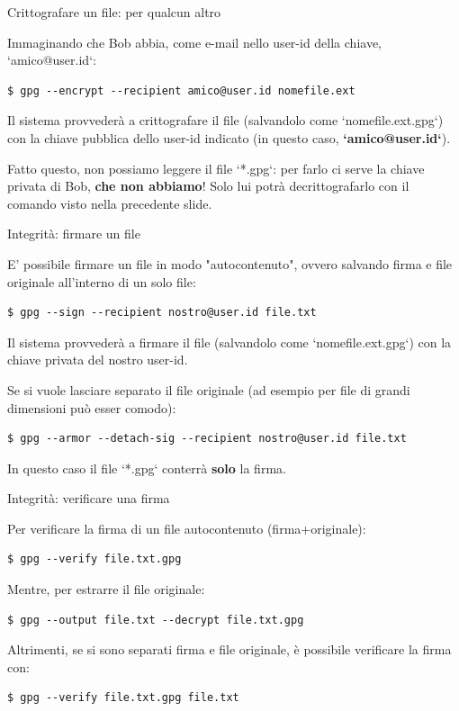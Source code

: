 \documentclass[10pt]{beamer}
\begin{document}
\begin{frame}[fragile]{Crittografare un file: per qualcun altro}

Immaginando che Bob abbia, come e-mail nello user-id della chiave, `amico@user.id`:

\begin{verbatim}
$ gpg --encrypt --recipient amico@user.id nomefile.ext
\end{verbatim}

Il sistema provvederà a crittografare il file (salvandolo come `nomefile.ext.gpg`) con la chiave pubblica dello user-id indicato (in questo caso, \textbf{`amico@user.id`}).

Fatto questo, non possiamo leggere il file `*.gpg`: per farlo ci serve la chiave privata di Bob, \textbf{che non abbiamo}! Solo lui potrà decrittografarlo con il comando visto nella precedente slide.

\end{frame}

\begin{frame}[fragile]{Integrità: firmare un file}

E' possibile firmare un file in modo "autocontenuto", ovvero salvando firma e file originale all'interno di un solo file:

\begin{verbatim}
$ gpg --sign --recipient nostro@user.id file.txt
\end{verbatim}

Il sistema provvederà a firmare il file (salvandolo come `nomefile.ext.gpg`) con la chiave privata del nostro user-id.

Se si vuole lasciare separato il file originale (ad esempio per file di grandi dimensioni può esser comodo):

\begin{verbatim}
$ gpg --armor --detach-sig --recipient nostro@user.id file.txt
\end{verbatim}

In questo caso il file `*.gpg` conterrà \textbf{solo} la firma.

\end{frame}

\begin{frame}[fragile]{Integrità: verificare una firma}

Per verificare la firma di un file autocontenuto (firma+originale):

\begin{verbatim}
$ gpg --verify file.txt.gpg
\end{verbatim}

Mentre, per estrarre il file originale:

\begin{verbatim}
$ gpg --output file.txt --decrypt file.txt.gpg
\end{verbatim}

Altrimenti, se si sono separati firma e file originale, è possibile verificare la firma con:

\begin{verbatim}
$ gpg --verify file.txt.gpg file.txt
\end{verbatim}

\end{frame}
\end{document}
